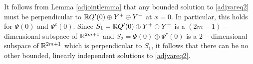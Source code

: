 \documentclass[thesis.tex]{subfiles}
\begin{document}
It follows from Lemma \ref{adjointlemma} that any bounded solution to \eqref{adjvareq2} must be perpendicular to $\mathbb{R} Q'(0) \oplus Y^+ \oplus Y^-$ at $x = 0$. In particular, this holds for $\Psi(0)$ and $\Psi^c(0)$. Since $S_1 = \mathbb{R} Q'(0) \oplus Y^+ \oplus Y^-$ is a $(2m-1)-$dimensional subspace of $\mathbb{R}^{2m+1}$ and $S_2 = \Psi(0) \oplus \Psi^c(0)$ is a $2-$dimensional subspace of $\mathbb{R}^{2m+1}$ which is perpendicular to $S_1$, it follows that there can be no other bounded, linearly independent solutions to \eqref{adjvareq2}.

\iffulldocument\else
	
	
\fi
\end{document}
